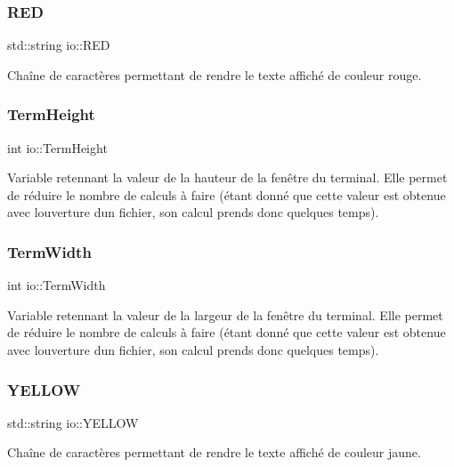 \mbox{\label{namespaceio_ac9181eea4e6d57e5481bc7e5822de4cb}} 
\subsubsection{\texorpdfstring{R\+ED}{RED}}
{\footnotesize\ttfamily std\+::string io\+::\+R\+ED}



Chaîne de caractères permettant de rendre le texte affiché de couleur rouge. 

\mbox{\label{namespaceio_afaeef00a45e14dc7227025fa7fd27240}} 
\subsubsection{\texorpdfstring{Term\+Height}{TermHeight}}
{\footnotesize\ttfamily int io\+::\+Term\+Height}



Variable retennant la valeur de la hauteur de la fenêtre du terminal. Elle permet de réduire le nombre de calculs à faire (étant donné que cette valeur est obtenue avec l\textquotesingle{}ouverture d\textquotesingle{}un fichier, son calcul prends donc quelques temps). 

\mbox{\label{namespaceio_a09b19ec88fb58a6086ca54be52b7bc08}} 
\subsubsection{\texorpdfstring{Term\+Width}{TermWidth}}
{\footnotesize\ttfamily int io\+::\+Term\+Width}



Variable retennant la valeur de la largeur de la fenêtre du terminal. Elle permet de réduire le nombre de calculs à faire (étant donné que cette valeur est obtenue avec l\textquotesingle{}ouverture d\textquotesingle{}un fichier, son calcul prends donc quelques temps). 

\mbox{\label{namespaceio_a0bb7c89e9e48840601811e4e35421767}} 
\subsubsection{\texorpdfstring{Y\+E\+L\+L\+OW}{YELLOW}}
{\footnotesize\ttfamily std\+::string io\+::\+Y\+E\+L\+L\+OW}



Chaîne de caractères permettant de rendre le texte affiché de couleur jaune. 

